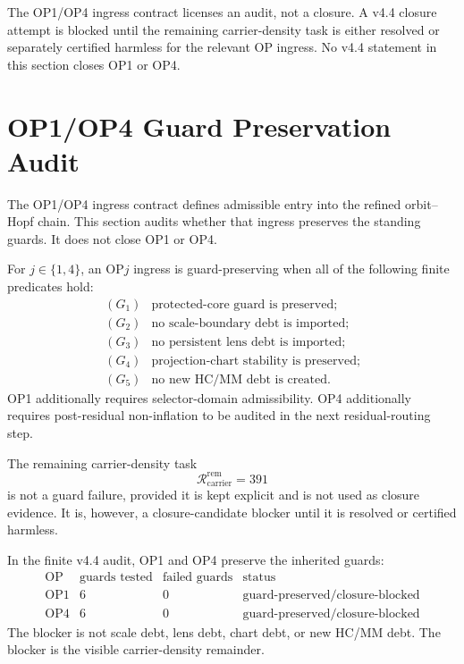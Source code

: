 \begin{theorem}
The OP1/OP4 ingress contract licenses an audit, not a closure.  A v4.4 closure
attempt is blocked until the remaining carrier-density task is either resolved
or separately certified harmless for the relevant OP ingress.  No v4.4
statement in this section closes OP1 or OP4.
\end{theorem}



\section{OP1/OP4 Guard Preservation Audit}
\label{sec:v44-op1-op4-guard-preservation-audit}

The OP1/OP4 ingress contract defines admissible entry into the refined
orbit--Hopf chain.  This section audits whether that ingress preserves the
standing guards.  It does not close OP1 or OP4.

\begin{definition}
For \(j\in\{1,4\}\), an OP\(j\) ingress is guard-preserving when all of the
following finite predicates hold:
\[
\begin{array}{ll}
(G_1) & \text{protected-core guard is preserved;}\\
(G_2) & \text{no scale-boundary debt is imported;}\\
(G_3) & \text{no persistent lens debt is imported;}\\
(G_4) & \text{projection-chart stability is preserved;}\\
(G_5) & \text{no new HC/MM debt is created.}
\end{array}
\]
OP1 additionally requires selector-domain admissibility.  OP4 additionally
requires post-residual non-inflation to be audited in the next residual-routing
step.
\end{definition}

\begin{definition}
The remaining carrier-density task
\[
    \mathcal R_{\mathrm{carrier}}^{\mathrm{rem}}=391
\]
is not a guard failure, provided it is kept explicit and is not used as
closure evidence.  It is, however, a closure-candidate blocker until it is
resolved or certified harmless.
\end{definition}

\begin{proposition}
In the finite v4.4 audit, OP1 and OP4 preserve the inherited guards:
\[
\begin{array}{c|c|c|c}
\text{OP} & \text{guards tested} & \text{failed guards} & \text{status}\\
\hline
\mathrm{OP1} & 6 & 0 & \mathrm{guard\text{-}preserved/closure\text{-}blocked}\\
\mathrm{OP4} & 6 & 0 & \mathrm{guard\text{-}preserved/closure\text{-}blocked}
\end{array}
\]
The blocker is not scale debt, lens debt, chart debt, or new HC/MM debt.  The
blocker is the visible carrier-density remainder.
\end{proposition}

